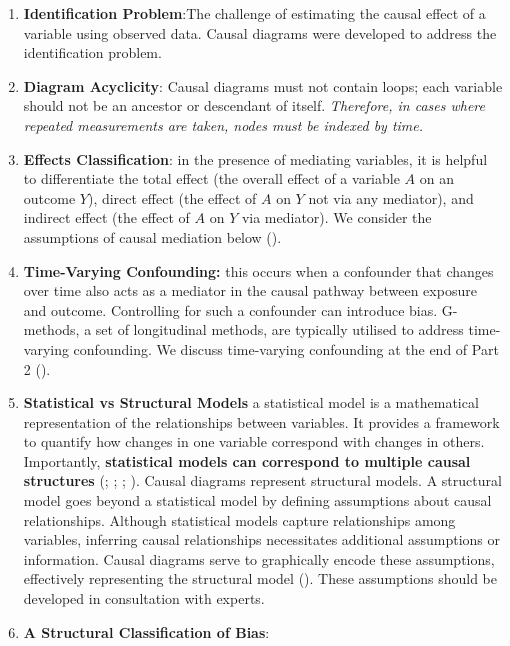 \documentclass[
  singlecolumn,
  9pt]{article}
\begin{document}
\begin{enumerate}
\def\labelenumi{\arabic{enumi}.}
\setcounter{enumi}{12}
\item
  \textbf{Identification Problem}:The challenge of estimating the causal
  effect of a variable using observed data. Causal diagrams were
  developed to address the identification problem.
\item
  \textbf{Diagram Acyclicity}: Causal diagrams must not contain loops;
  each variable should not be an ancestor or descendant of itself.
  \emph{Therefore, in cases where repeated measurements are taken, nodes
  must be indexed by time.}
\item
  \textbf{Effects Classification}: in the presence of mediating
  variables, it is helpful to differentiate the total effect (the
  overall effect of a variable \(A\) on an outcome \(Y\)), direct effect
  (the effect of \(A\) on \(Y\) not via any mediator), and indirect
  effect (the effect of \(A\) on \(Y\) via mediator). We consider the
  assumptions of causal mediation below
  ().
\item
  \textbf{Time-Varying Confounding:} this occurs when a confounder that
  changes over time also acts as a mediator in the causal pathway
  between exposure and outcome. Controlling for such a confounder can
  introduce bias. G-methods, a set of longitudinal methods, are
  typically utilised to address time-varying confounding. We discuss
  time-varying confounding at the end of Part 2
  ().
\item
  \textbf{Statistical vs Structural Models} a statistical model is a
  mathematical representation of the relationships between variables. It
  provides a framework to quantify how changes in one variable
  correspond with changes in others. Importantly, \textbf{statistical
  models can correspond to multiple causal structures}
  (;
  ;
  ;
  ). Causal diagrams
  represent structural models. A structural model goes beyond a
  statistical model by defining assumptions about causal relationships.
  Although statistical models capture relationships among variables,
  inferring causal relationships necessitates additional assumptions or
  information. Causal diagrams serve to graphically encode these
  assumptions, effectively representing the structural model
  (). These
  assumptions should be developed in consultation with experts.
\item
  \textbf{A Structural Classification of Bias}:
\end{enumerate}
\end{document}
